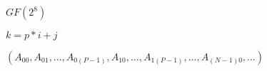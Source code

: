 \documentclass{article}
\begin{document}
$ GF(2^8) $
\pagebreak

$ k = p * i + j $
\pagebreak

$ (A_00, A_01, ..., A_{0(P - 1)}, A_10, ..., A_{1(P - 1)}, ..., A_{(N-1)0}, ...) $
\pagebreak
\end{document}
